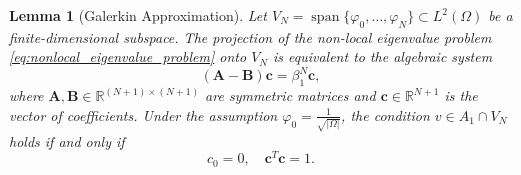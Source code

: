 \documentclass[11pt, a4paper]{article}
\theoremstyle{break}
\theoremstyle{break}
\theoremstyle{break}
\theoremstyle{break}
\theoremstyle{break}
\newtheorem{lem}{Lemma}[section]
\theoremstyle{break}
\theoremstyle{break}
\theoremstyle{break}
\theoremstyle{break}
\theoremstyle{break}
\begin{document}
\begin{lem}[Galerkin Approximation]
\label{lem:galerkin_approximation}
Let $V_N = \operatorname{span}\{\varphi_0, \dots, \varphi_N\} \subset L^2(\Omega)$ be a finite-dimensional subspace. The projection of the non-local eigenvalue problem \eqref{eq:nonlocal_eigenvalue_problem} onto $V_N$ is equivalent to the algebraic system 
\begin{equation}
    \label{eq:matrix_system_lemma}
    (\mathbf{A} - \mathbf{B})\mathbf{c} = \beta_1^N \mathbf{c},
\end{equation}
    where $\mathbf{A}, \mathbf{B} \in \mathbb{R}^{(N+1) \times (N+1)}$ are symmetric matrices and $\mathbf{c} \in \mathbb{R}^{N+1}$ is the vector of coefficients. Under the assumption $\varphi_0 = \frac{1}{\sqrt{|\Omega|}}$, the condition $v \in A_1 \cap V_N$ holds if and only if
    \begin{equation}
        \label{eq:system_constraint_lemma}
        c_0 = 0, \quad \mathbf{c}^T\mathbf{c} = 1.
    \end{equation}
\end{lem}
\end{document}
